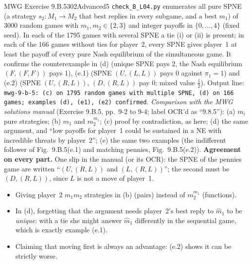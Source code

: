 \begin{exsol}{MWG Exercise 9.B.5}{302}{Advanced}{5}
\verify \texttt{check\_B\_L04.py} enumerates all pure SPNE (a strategy $s_2: M_1 \to M_2$ that best
replies in every subgame, and a best $m_1$) of 3000 random games with $m_1, m_2 \in \{2, 3\}$ and
integer payoffs in $\{0, \dots, 4\}$ (fixed seed). In each of the 1795 games with several SPNE a tie
(i) or (ii) is present; in each of the 166 games without ties for player~2, every SPNE gives player~1
at least the payoff of every pure Nash equilibrium of the simultaneous game. It confirms the
counterexample in (d) (unique SPNE pays 2, the Nash equilibrium $(F, (F,F))$ pays 1), (e.1) (SPNE
$(U, (L,L))$ pays 0 against $\pi_1 = 1$) and (e.2) (SPNE $(U,(R,L))$, $(D,(R,L))$ pay 0; mixed value
$\frac12$). Output line: \texttt{mwg-9-b-5: (c) on 1795 random games with multiple SPNE, (d) on 166
games; examples (d), (e1), (e2) confirmed}. \emph{Comparison with the MWG solutions manual}
(Exercise 9.B.5, pp.~9-2 to 9-4; label OCR'd as ``9.8.5''): (a) $m_i$ pure strategies; (b) $m_1$ and
$m_2^{m_1}$; (c) proof by contradiction, as here; (d) the same argument, and ``low payoffs for player~1
could be sustained in a NE with incredible threats by player~2''; (e) the same two examples (the
indifferent follower of Fig.~9.B.5(e.1) and matching pennies, Fig.~9.B.5(e.2)). \textbf{Agreement on
every part.} One slip in the manual (or its OCR): the SPNE of the pennies game are written
``$(U,(R,L))$ and $(L,(R,L))$''; the second must be $(D, (R,L))$, since $L$ is not a move of player~1.

\mistakes
\begin{itemize}
  \item Giving player~2 $m_1 m_2$ strategies in (b) (pairs) instead of $m_2^{m_1}$ (functions).
  \item In (d), forgetting that the argument needs player~2's best reply to $\hat m_1$ to be
  \emph{unique}: with a tie she might answer $\hat m_1$ differently in the sequential game, which is
  exactly example (e.1).
  \item Claiming that moving first is always an advantage: (e.2) shows it can be strictly worse.
\end{itemize}

\end{exsol}
